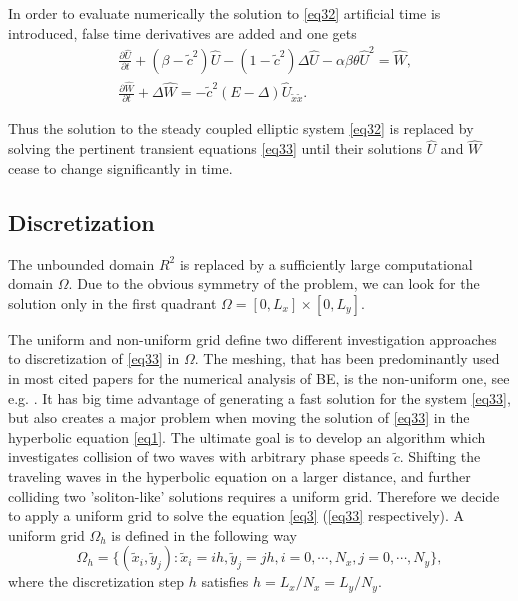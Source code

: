 \documentclass[12pt]{article}
\theoremstyle{theorem}
\theoremstyle{defi}
\begin{document}
In order to evaluate numerically the solution to \eqref{eq32} artificial time is introduced, false time derivatives are added and one gets
\begin{equation}\label{eq33}
\begin{split}
&\frac {\partial \widehat{U}}{\partial t} + (\beta-\tilde c^2) \widehat{U} - (1-\tilde c^2 ) \Delta \widehat{U} - \alpha \beta \theta \widehat{U}^2 = \widehat{W}, \\
&\frac {\partial \widehat{W}}{\partial t} + \Delta \widehat{W} = - \tilde c^2 (E- \Delta) \widehat{U}_{\tilde x \tilde x}.
\end{split}
\end{equation}

Thus the solution to the steady coupled elliptic system \eqref{eq32} is replaced by solving the pertinent transient equations \eqref{eq33} until their solutions $\widehat{U}$ and $\widehat{W}$ cease to change significantly in time.

\subsection{Discretization}

The unbounded domain $R^2$ is replaced by a sufficiently large computational domain $\Omega$. Due to the obvious symmetry of the problem, we can look for the solution only in the first quadrant $\Omega = [0,L_x] \times[0,L_y]$.

The uniform and non-uniform grid define two different investigation approaches to discretization of \eqref{eq33} in $\Omega$. The meshing, that has been predominantly used in most cited papers for the numerical analysis of BE, is the non-uniform one, see e.g. \cite{ref6}. It has big time advantage of generating a fast solution for the system \eqref{eq33}, but also creates a major problem when moving the solution of \eqref{eq33} in the hyperbolic equation \eqref{eq1}. The ultimate goal is to develop an algorithm which investigates collision of two waves with arbitrary phase speeds $\tilde c$. Shifting the traveling waves in the hyperbolic equation on a larger distance, and further colliding two 'soliton-like' solutions requires a uniform grid. Therefore we decide to apply a uniform grid to solve the equation \eqref{eq3} (\eqref{eq33} respectively).
A uniform grid $\Omega_h$ is defined in the following way
$$
\Omega_h = \{(\tilde x_i, \tilde y_j): \tilde x_i = ih, \tilde y_j = jh, i = 0,\cdots ,N_x, j = 0,\cdots , N_y \},
$$
where the discretization step $h$ satisfies
$ h = L_x/N_x = L_y/N_y$.
\end{document}
